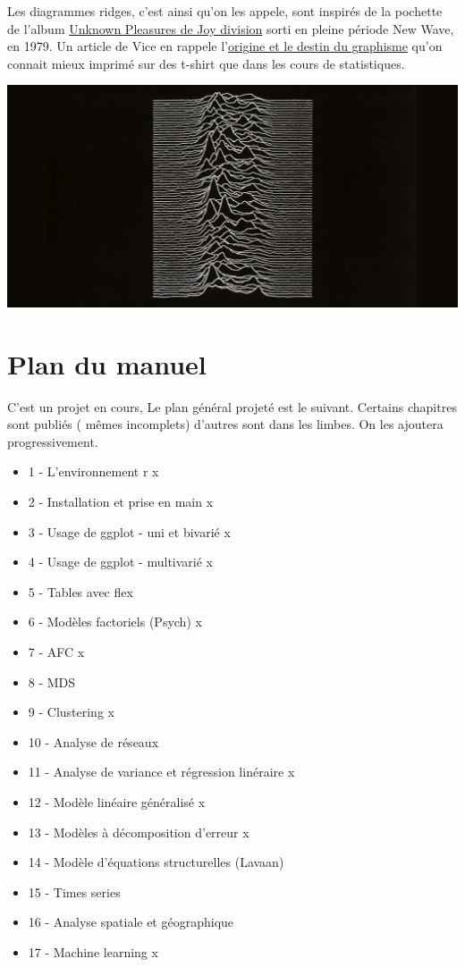 \documentclass[
]{book}
\providecommand{\tightlist}{%
  \setlength{\itemsep}{0pt}\setlength{\parskip}{0pt}}
\begin{document}
Les diagrammes ridges, c'est ainsi qu'on les appele, sont inspirés de la pochette de l'album \href{https://www.youtube.com/watch?v=7PtvIr2oiaE}{Unknown Pleasures de Joy division} sorti en pleine période New Wave, en 1979. Un article de Vice en rappele l'\href{https://i-d.vice.com/fr/article/pabjam/pourquoi-cette-pochette-dalbum-de-joy-division-a-inspire-le-monde-entier}{origine et le destin du graphisme} qu'on connait mieux imprimé sur des t-shirt que dans les cours de statistiques.

\includegraphics{./Images/joydivisiondetail.jpg}
\newpage

\hypertarget{plan-du-manuel}{%
\section{Plan du manuel}\label{plan-du-manuel}}

C'est un projet en cours, Le plan général projeté est le suivant. Certains chapitres sont publiés ( mêmes incomplets) d'autres sont dans les limbes. On les ajoutera progressivement.

\begin{itemize}
\tightlist
\item
  1 - L'environnement r x
\item
  2 - Installation et prise en main x
\item
  3 - Usage de ggplot - uni et bivarié x
\item
  4 - Usage de ggplot - multivarié x
\item
  5 - Tables avec flex
\item
  6 - Modèles factoriels (Psych) x
\item
  7 - AFC x
\item
  8 - MDS
\item
  9 - Clustering x
\item
  10 - Analyse de réseaux
\item
  11 - Analyse de variance et régression linéraire x
\item
  12 - Modèle linéaire généralisé x
\item
  13 - Modèles à décomposition d'erreur x
\item
  14 - Modèle d'équations structurelles (Lavaan)
\item
  15 - Times series
\item
  16 - Analyse spatiale et géographique
\item
  17 - Machine learning x
\end{itemize}
\end{document}
